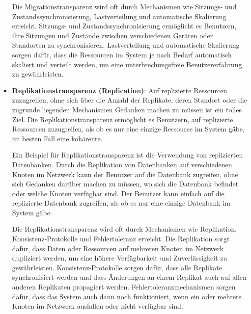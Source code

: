 \documentclass[../vs-script-first-v01.tex]{subfiles}
\begin{document}
\begin{itemize}
        Die Migrationstransparenz wird oft durch Mechanismen wie Sitzungs- und Zustandssynchronisierung, Lastverteilung und automatische Skalierung erreicht. Sitzungs- und Zustandssynchronisierung ermöglicht es Benutzern, ihre Sitzungen und Zustände zwischen verschiedenen Geräten oder Standorten zu synchronisieren. Lastverteilung und automatische Skalierung sorgen dafür, dass die Ressourcen im System je nach Bedarf automatisch skaliert und verteilt werden, um eine unterbrechungsfreie Benutzererfahrung zu gewährleisten.

  \item \textbf{Replikationstransparenz (Replication)}:  Auf replizierte Ressourcen zuzugreifen, ohne sich über die Anzahl der Replikate, deren Standort oder die zugrunde liegenden Mechanismen Gedanken machen zu müssen ist ein tolles Ziel. Die  Replikationstransparenz ermöglicht es Benutzern, auf replizierte Ressourcen zuzugreifen, als ob es nur eine einzige Ressource im System gäbe, im besten Fall eine kohärente.

        Ein Beispiel für Replikationstransparenz ist die Verwendung von replizierten Datenbanken. Durch die Replikation von Datenbanken auf verschiedenen Knoten im Netzwerk kann der Benutzer auf die Datenbank zugreifen, ohne sich Gedanken darüber machen zu müssen, wo sich die Datenbank befindet oder welche Knoten verfügbar sind. Der Benutzer kann einfach auf die replizierte Datenbank zugreifen, als ob es nur eine einzige Datenbank im System gäbe.


        Die Replikationstransparenz wird oft durch Mechanismen wie Replikation, Konsistenz-Protokolle und Fehlertoleranz erreicht. Die Replikation sorgt dafür, dass Daten oder Ressourcen auf mehreren Knoten im Netzwerk dupliziert werden, um eine höhere Verfügbarkeit und Zuverlässigkeit zu gewährleisten. Konsistenz-Protokolle sorgen dafür, dass alle Replikate synchronisiert werden und dass Änderungen an einem Replikat auch auf allen anderen Replikaten propagiert werden. Fehlertoleranzmechanismen sorgen dafür, dass das System auch dann noch funktioniert, wenn ein oder mehrere Knoten im Netzwerk ausfallen oder nicht verfügbar sind.


\end{itemize}
\end{document}
